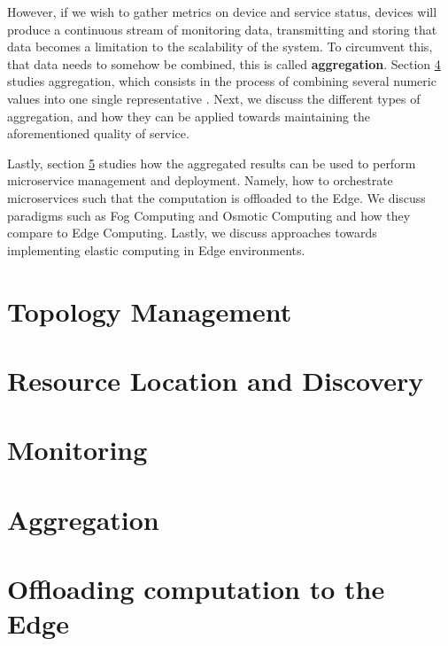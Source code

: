 However, if we wish to gather metrics on device and service status, devices will produce a continuous stream of monitoring data, transmitting and storing that data becomes a limitation to the scalability of the system. To circumvent this, that data needs to somehow be combined, this is called \textbf{aggregation}. Section \ref{sec:aggregation} studies aggregation, which consists in the process of combining several numeric values into one single representative \cite{grabisch2009aggregation}. Next, we discuss the different types of aggregation, and how they can be applied towards maintaining the aforementioned quality of service.

Lastly, section \ref{sec:offloading_computation} studies how the aggregated results can be used to perform microservice management and deployment. Namely, how to orchestrate microservices such that the computation is offloaded to the Edge. We discuss paradigms such as Fog Computing and Osmotic Computing and how they compare to Edge Computing. Lastly, we discuss approaches towards implementing elastic computing in Edge environments.

\section{Topology Management} \label{sec:topology_management} 

\section{Resource Location and Discovery} \label{sec:res_location} 

\section{Monitoring} \label{sec:res_monitoring} 

\section{Aggregation} \label{sec:aggregation} 

\section{Offloading computation to the Edge} \label{sec:offloading_computation} 

